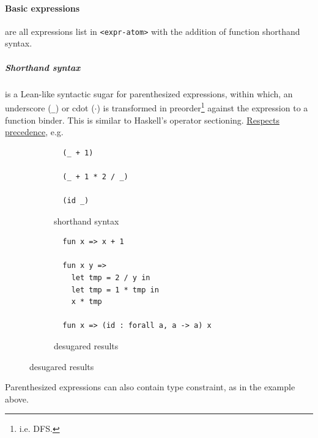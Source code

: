 \documentclass[a4paper, 11pt]{article}
\theoremstyle{remark}\newtheorem*{remark}{Remark}
\theoremstyle{definition}\newtheorem*{definition}{Definition}
\begin{document}
\paragraph{Basic expressions} are all expressions list in \texttt{<expr-atom>} with the addition of
function shorthand syntax.
\subparagraph{Shorthand syntax} is a Lean-like syntactic sugar for parenthesized expressions, within which,
an underscore (\texttt{\_}) or cdot (\(\cdot\)) is transformed in preorder\footnote{i.e. DFS.}
against the expression to a function binder. This is similar to Haskell's operator sectioning.
\underline{Respects precedence}, e.g.
\begin{figure}[H]
  \centering
  \begin{subfigure}{0.5\textwidth}\centering
\begin{verbatim}
  (_ + 1)

  (_ + 1 * 2 / _)

  (id _)
\end{verbatim}
    \caption{shorthand syntax}
  \end{subfigure}%
  \begin{subfigure}{0.5\textwidth}\centering
\begin{verbatim}
  fun x => x + 1

  fun x y =>
    let tmp = 2 / y in
    let tmp = 1 * tmp in
    x * tmp

  fun x => (id : forall a, a -> a) x
\end{verbatim}
    \caption{desugared results}
  \end{subfigure}
\end{figure}
Parenthesized expressions can also contain type constraint, as in the example above.
\end{document}
